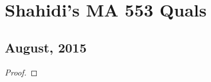 \chapter{Shahidi's MA 553 Quals}
\section{August, 2015}
\begin{problem}

\end{problem}
\begin{proof}
\end{proof}

